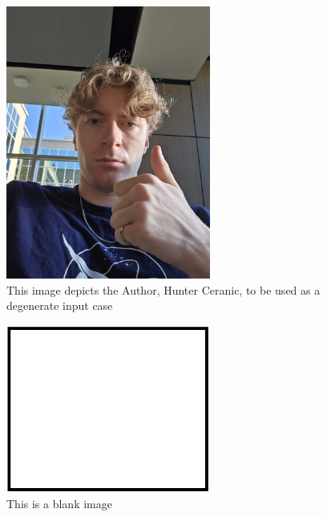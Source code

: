 \documentclass[12pt, titlepage]{article}
\begin{document}
\begin{figure}[h!]
  \begin{center}
    \includegraphics[width=0.6\textwidth]{hunter}
  \caption{This image depicts the Author, Hunter Ceranic, to be used as a degenerate input case}
  \label{hunter} 
  \end{center}
  \end{figure}

\begin{figure}[h!]
  \begin{center}
    \includegraphics[width=0.6\textwidth]{Blank}
  \caption{This is a blank image}
  \label{Fig_blank} 
  \end{center}
  \end{figure}
\end{document}

